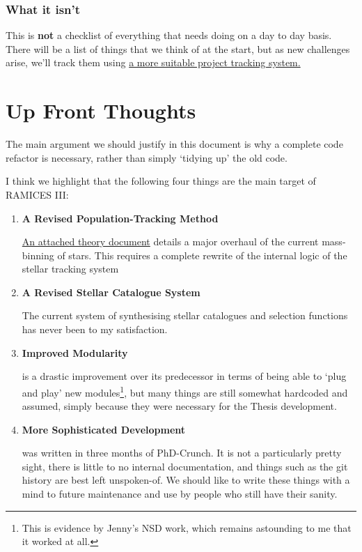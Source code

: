 \documentclass[a4paper,10pt]{article}
\begin{document}
			\subsubsection*{What it isn't}
				
				This is \textbf{not} a checklist of everything that needs doing on a day to day basis. There will be a list of things that we think of at the start, but as new challenges arise, we'll track them using \href{{https://github.com/users/DrFraserGovil/projects/3/views/1}}{a more suitable project tracking system.}

		\newpage
		\section{Up Front Thoughts}

			
			The main argument we should justify in this document is why a complete code refactor is necessary, rather than simply `tidying up' the old code.

			I think we highlight that the following four things are the main target of RAMICES III:
			\begin{enumerate}
				\item \textbf{A Revised Population-Tracking Method} 
				
				\href{theory.pdf}{An attached theory document} details a major overhaul of the current mass-binning of stars. This requires a complete rewrite of the internal logic of the stellar tracking system

				\item \textbf{A Revised Stellar Catalogue System}
				
				The current system of synthesising stellar catalogues and selection functions has never been to my satisfaction.
				\item \textbf{Improved Modularity} 
				
				\RTwo{} is a drastic improvement over its predecessor in terms of being able to `plug and play' new modules\footnote{This is evidence by Jenny's NSD work, which remains astounding to me that it worked at all.}, but many things are still somewhat hardcoded and assumed, simply because they were necessary for the Thesis development.
				\item \textbf{More Sophisticated Development}
				
				\RTwo{} was written in three months of PhD-Crunch. It is not a particularly pretty sight, there is little to no internal documentation, and things such as the git history are best left unspoken-of. We should like to write these things with a mind to future maintenance and use by people who still have their sanity.
			\end{enumerate}
\end{document}
